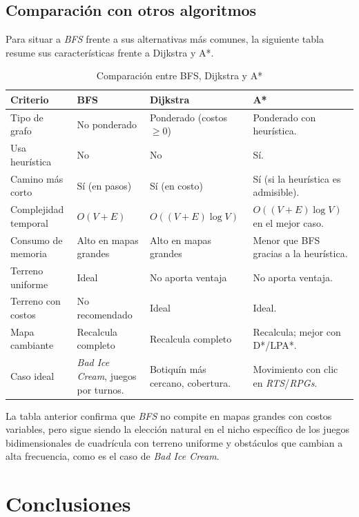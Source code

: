 \documentclass[12pt,letterpaper]{article}
\begin{document}
\subsection{Comparación con otros algoritmos}

Para situar a \textit{BFS} frente a sus alternativas más comunes, la siguiente tabla resume sus características frente a Dijkstra y A*.

\begin{table}[H]
\centering
\caption{Comparación entre BFS, Dijkstra y A*}
\small
\begin{tabularx}{\textwidth}{L{2.4cm}L{3.0cm}L{3.6cm}Y}
\toprule
\textbf{Criterio} & \textbf{BFS} & \textbf{Dijkstra} & \textbf{A*} \\
\midrule
Tipo de grafo & No ponderado & Ponderado (costos $\geq 0$) & Ponderado con heurística. \\
Usa heurística & No & No & Sí. \\
Camino más corto & Sí (en pasos) & Sí (en costo) & Sí (si la heurística es admisible). \\
Complejidad temporal & $O(V + E)$ & $O((V + E)\log V)$ & $O((V + E)\log V)$ en el mejor caso. \\
Consumo de memoria & Alto en mapas grandes & Alto en mapas grandes & Menor que BFS gracias a la heurística. \\
Terreno uniforme & Ideal & No aporta ventaja & No aporta ventaja. \\
Terreno con costos & No recomendado & Ideal & Ideal. \\
Mapa cambiante & Recalcula completo & Recalcula completo & Recalcula; mejor con D*/LPA*. \\
Caso ideal & \textit{Bad Ice Cream}, juegos por turnos. & Botiquín más cercano, cobertura. & Movimiento con clic en \textit{RTS}/\textit{RPGs}. \\
\bottomrule
\end{tabularx}
\end{table}

La tabla anterior confirma que \textit{BFS} no compite en mapas grandes con costos variables, pero sigue siendo la elección natural en el nicho específico de los juegos bidimensionales de cuadrícula con terreno uniforme y obstáculos que cambian a alta frecuencia, como es el caso de \textit{Bad Ice Cream}.

\section{Conclusiones}
\end{document}
